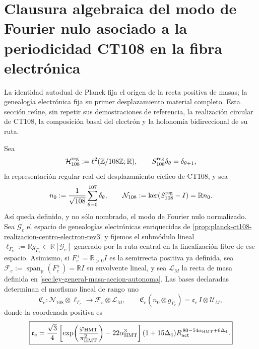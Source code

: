 \section{Clausura algebraica del modo de Fourier nulo asociado a la periodicidad CT108 en la fibra electrónica}
\label{sec:clausura-nulo-material-electron-rev3}

La identidad autodual de Planck fija el origen de la recta positiva de
masas; la genealogía electrónica fija su primer desplazamiento material
completo. Esta sección reúne, sin repetir sus demostraciones de referencia,
la realización circular de CT108, la composición basal del electrón y la
holonomía bidireccional de su ruta.

Sea
\[
 \mathcal H_{108}^{\rm reg}
 :=\ell^2(\mathbb Z/108\mathbb Z;\mathbb R),
 \qquad
 S_{108}^{\rm reg}\delta_\theta=\delta_{\theta+1},
\]
la representación regular real del desplazamiento cíclico de CT108, y sea
\[
 n_0:=\frac1{\sqrt{108}}\sum_{\theta=0}^{107}\delta_\theta,
 \qquad
 \mathcal N_{108}:=\ker(S_{108}^{\rm reg}-I)=\mathbb R n_0.
\]
Así queda definido, y no sólo nombrado, el modo de Fourier nulo normalizado.
Sea \(\mathcal G_e\) el espacio de genealogías electrónicas enriquecidas de
\cref{prop:planck-ct108-realizacion-centro-electron-rev3} y fijemos el
submódulo lineal
\(\ell_{\Gamma_e}:=\mathbb R g_{\Gamma_e}
\subset\mathbb R[\mathcal G_e]\) generado por la ruta central en la
linealización libre de ese espacio. Asimismo, si
\(F_e^+=\mathbb R_{>0}I\) es la semirrecta positiva ya definida, sea
\(\mathcal F_e:=\operatorname{span}_{\mathbb R}(F_e^+)=\mathbb R I\) su
envolvente lineal, y sea
\(\mathcal L_M\) la recta de masa definida en
\cref{sec:ley-general-masa-accion-autonoma}. Las bases declaradas determinan
el morfismo lineal de rango uno
\begin{equation}
 \mathfrak C_e:
 \mathcal N_{108}\otimes\ell_{\Gamma_e}
 \longrightarrow \mathcal F_e\otimes\mathcal L_M,
 \qquad
 \mathfrak C_e(n_0\otimes g_{\Gamma_e})
 =\mathfrak c_e\,I\otimes\mathcal U_M,
 \label{eq:morfismo-clausura-nulo-material-electron-rev3}
\end{equation}
donde la coordenada positiva es
\begin{equation}
 \boxed{
 \mathfrak c_e=
 \frac{\sqrt3}{4}
 \left[
  \exp\!\left(\frac{\varphi_{\rm HMT}}{\pi_{\rm HMT}^{2}}\right)
  -22\alpha_{\rm HMT}^{3}
 \right]
 (1+15\Delta_4)
 R_{\rm act}^{\,80-54\alpha_{\rm HMT}+6\Delta_4}.}
 \label{eq:coordenada-clausura-nulo-material-electron-rev3}
\end{equation}

